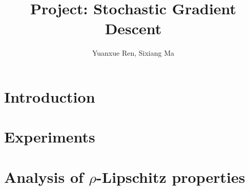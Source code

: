 \documentclass[11pt]{article}
\title{Project: Stochastic Gradient Descent}
\author{Yuanxue Ren, Sixiang Ma}
\date{}
\begin{document}
\maketitle

\section{Introduction}

\section{Experiments}

\section{Analysis of $\rho$-Lipschitz properties}
\end{document}
